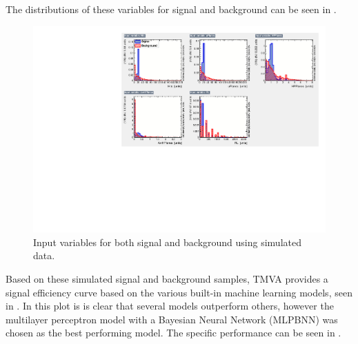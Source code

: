 The distributions of these variables for signal and background can be seen in .

\begin{figure}[h!]
\centering

\includegraphics[width=\textwidth]{figures/TMVA/inputvariables.pdf}
\caption{Input variables for both signal and background using simulated data.}
\label{fig:TMVAinput}
\end{figure}

Based on these simulated signal and background samples, TMVA provides a signal efficiency curve based on the various built-in machine learning models, seen in . In this plot is is clear that several models outperform others, however the multilayer perceptron model with a Bayesian Neural Network (MLPBNN) was chosen as the best performing model. The specific performance can be seen in .




